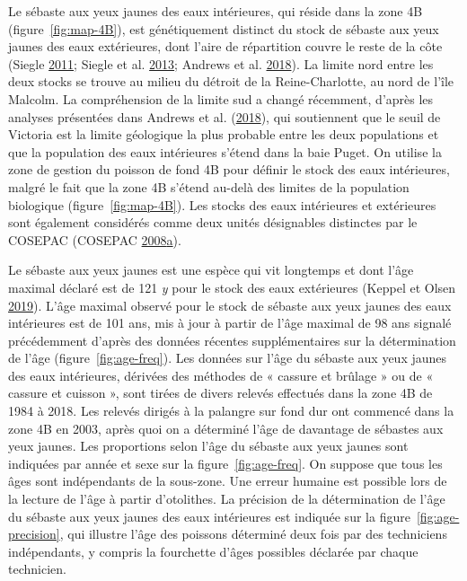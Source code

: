 \documentclass[french,11pt]{book}
\begin{document}
Le sébaste aux yeux jaunes des eaux intérieures, qui réside dans la zone 4B (figure~\ref{fig:map-4B}), est génétiquement distinct du stock de sébaste aux yeux jaunes des eaux extérieures, dont l'aire de répartition couvre le reste de la côte (Siegle \protect\hyperlink{ref-siegle2011}{2011}; Siegle et al. \protect\hyperlink{ref-siegle2013}{2013}; Andrews et al. \protect\hyperlink{ref-andrews2018}{2018}). La limite nord entre les deux stocks se trouve au milieu du détroit de la Reine-Charlotte, au nord de l'île Malcolm. La compréhension de la limite sud a changé récemment, d'après les analyses présentées dans Andrews et al. (\protect\hyperlink{ref-andrews2018}{2018}), qui soutiennent que le seuil de Victoria est la limite géologique la plus probable entre les deux populations et que la population des eaux intérieures s'étend dans la baie Puget. On utilise la zone de gestion du poisson de fond 4B pour définir le stock des eaux intérieures, malgré le fait que la zone 4B s'étend au-delà des limites de la population biologique (figure~\ref{fig:map-4B}). Les stocks des eaux intérieures et extérieures sont également considérés comme deux unités désignables distinctes par le COSEPAC (COSEPAC \protect\hyperlink{ref-cosewic2008}{2008}\protect\hyperlink{ref-cosewic2008}{a}).

\hypertarget{sec:growth}{%
\label{sec:growth}}

Le sébaste aux yeux jaunes est une espèce qui vit longtemps et dont l'âge maximal déclaré est de 121 \emph{y} pour le stock des eaux extérieures (Keppel et Olsen \protect\hyperlink{ref-keppel2019}{2019}). L'âge maximal observé pour le stock de sébaste aux yeux jaunes des eaux intérieures est de 101 ans, mis à jour à partir de l'âge maximal de 98 ans signalé précédemment d'après des données récentes supplémentaires sur la détermination de l'âge (figure~\ref{fig:age-freq}). Les données sur l'âge du sébaste aux yeux jaunes des eaux intérieures, dérivées des méthodes de « cassure et brûlage » ou de « cassure et cuisson », sont tirées de divers relevés effectués dans la zone 4B de 1984 à 2018. Les relevés dirigés à la palangre sur fond dur ont commencé dans la zone 4B en 2003, après quoi on a déterminé l'âge de davantage de sébastes aux yeux jaunes. Les proportions selon l'âge du sébaste aux yeux jaunes sont indiquées par année et sexe sur la figure~\ref{fig:age-freq}. On suppose que tous les âges sont indépendants de la sous-zone. Une erreur humaine est possible lors de la lecture de l'âge à partir d'otolithes. La précision de la détermination de l'âge du sébaste aux yeux jaunes des eaux intérieures est indiquée sur la figure~\ref{fig:age-precision}, qui illustre l'âge des poissons déterminé deux fois par des techniciens indépendants, y compris la fourchette d'âges possibles déclarée par chaque technicien.
\end{document}
